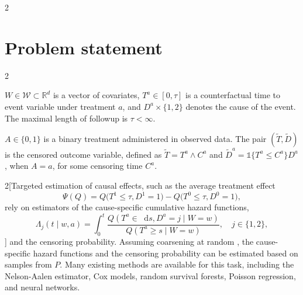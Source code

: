 \documentclass[a0,portrait]{a0poster}
\newcommand*\diff{\mathop{}\!\mathrm{d}}
\newcommand{\R}{\mathbb{R}}
\newcommand{\1}{\mathds{1}}
\begin{document}
\begin{minipage}{\textwidth}
\begin{minipage}[t]{1\linewidth}
\begin{multicols}{2}
\section*{Problem statement}
\vspace{-.2em}
\setlength{\columnseprule}{0pt}
\setlength{\columnsep}{30pt}
\begin{multicols}{2}
  \begin{tcolorbox}[width=\linewidth,colframe=white, title={\center \textbf{Ideal data: \( \left(W,
      T^{0}, D^{0}, T^{1}, D^{1}\right) \sim Q \)}}, coltitle=black, colbacktitle=white]
\( W \in \mathcal{W} \subset \R^d \) is a vector of covariates,
\( T^{a} \in [0, \tau] \) is a counterfactual time to event variable under
treatment \( a \), and \( D^{a} \times \{1,2\} \) denotes the cause of the
event. The maximal length of followup is $\tau <\infty$.
\end{tcolorbox}

\begin{tcolorbox}[width=\linewidth,colframe=white, title={\center\textbf{
      Observed data: \( O= (W,
    A, \tilde T, \tilde D) \sim P \)}}, coltitle=black,
  colbacktitle=white]
  \( A \in {\{0,1\}} \) is a binary treatment administered in observed
  data. The pair \( (\tilde T, \tilde D) \) is the censored
  outcome variable, defined as \( \tilde T = T^a \wedge C^a \) and
  \( \tilde D^a = \1{\{T^a \leq C^a\}} D^a \), when \( A=a \), for some
  censoring time \( C^a \).
\end{tcolorbox}
\end{multicols}

\begin{multicols}{2}[{Targeted estimation of causal effects, such as the average treatment effect
    \begin{equation*}
      \Psi(Q) = 
      Q{
        \bigl(
          T^{1} \leq \tau, D^{1}=1
        \bigr)}-
      Q{\bigl(
          T^{0} \leq \tau, D^{0}=1
        \bigr)},
    \end{equation*}
    rely on estimators of the cause-specific cumulative hazard functions,
\begin{equation*}
  \Lambda_{j}(t \mid w, a) = \int_0^t\frac{  Q(T^a \in \diff s, D^a=j \mid W=w)}
  {Q(T^a \geq s \mid W=w)},
  \quad j \in \{1,2\},
\end{equation*}\vspace{-1em}}]
and the censoring probability. Assuming coarsening at random
\cite{gill1997coarsening,van2003unified}, the cause-specific hazard functions
and the censoring probability can be estimated based on samples from \( P \).
Many existing methods are available for this task, including the Nelson-Aalen
estimator, Cox models, random survival forests, Poisson regression, and neural
networks. %


\end{multicols}
\end{multicols}
\end{minipage}
\end{minipage}
\end{document}
